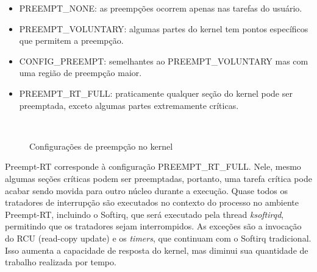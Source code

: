 \begin{itemize}
  \item PREEMPT\_NONE: as preempções ocorrem apenas nas tarefas do usuário.
  \item PREEMPT\_VOLUNTARY: algumas partes do kernel tem pontos específicos que permitem a preempção.
  \item CONFIG\_PREEMPT: semelhantes ao PREEMPT\_VOLUNTARY mas com uma região de preempção maior.
  \item PREEMPT\_RT\_FULL: praticamente qualquer seção do kernel pode ser preemptada, exceto algumas partes extremamente críticas.
\end{itemize}

\begin{figure}[!htb]
\centering
{}%
\\
%
\caption{Configurações de preempção no kernel \cite{Huang2017}}
\label{some example}
\end{figure}

Preempt-RT corresponde à configuração PREEMPT\_RT\_FULL. Nele, mesmo algumas seções críticas podem ser preemptadas, portanto, uma tarefa crítica pode acabar sendo movida para outro núcleo durante a execução. Quase todos os tratadores de interrupção são executados no contexto do processo no ambiente Preempt-RT, incluindo o Softirq, que será executado pela thread \textit{ksoftirqd}, permitindo que os tratadores sejam interrompidos. As exceções são a invocação do RCU (read-copy update) e os \textit{timers}, que continuam com o Softirq tradicional. Isso aumenta a capacidade de resposta do kernel, mas diminui sua quantidade de trabalho realizada por tempo.

